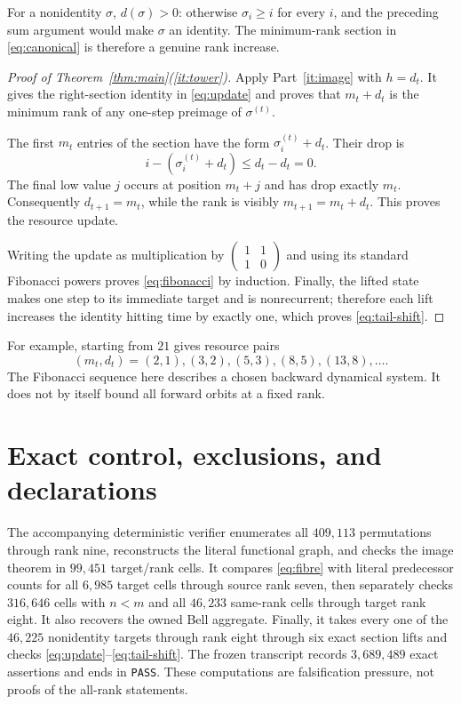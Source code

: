 \documentclass[a4paper,10pt]{amsart}
\theoremstyle{remark}
\begin{document}
For a nonidentity $\sigma$, $d(\sigma)>0$: otherwise
$\sigma_i\ge i$ for every $i$, and the preceding sum argument would make
$\sigma$ an identity.  The minimum-rank section in
\eqref{eq:canonical} is therefore a genuine rank increase.

\begin{proof}[Proof of Theorem~\ref{thm:main}(\ref{it:tower})]
Apply Part~\ref{it:image} with $h=d_t$.  It gives the right-section identity
in \eqref{eq:update} and proves that $m_t+d_t$ is the minimum rank of any
one-step preimage of $\sigma^{(t)}$.

The first $m_t$ entries of the section have the form
$\sigma^{(t)}_i+d_t$.  Their drop is
\[
 i-(\sigma^{(t)}_i+d_t)\le d_t-d_t=0.
\]
The final low value $j$ occurs at position $m_t+j$ and has drop exactly
$m_t$.  Consequently $d_{t+1}=m_t$, while the rank is visibly
$m_{t+1}=m_t+d_t$.  This proves the resource update.

Writing the update as multiplication by
$\left(\begin{smallmatrix}1&1\\1&0\end{smallmatrix}\right)$ and using its
standard Fibonacci powers proves \eqref{eq:fibonacci} by induction.  Finally,
the lifted state makes one step to its immediate target and is nonrecurrent;
therefore each lift increases the identity hitting time by exactly one,
which proves \eqref{eq:tail-shift}.
\end{proof}

For example, starting from $21$ gives resource pairs
\[
 (m_t,d_t)=(2,1),(3,2),(5,3),(8,5),(13,8),\ldots.
\]
The Fibonacci sequence here describes a chosen backward dynamical system.  It
does not by itself bound all forward orbits at a fixed rank.

\section{Exact control, exclusions, and declarations}\label{sec:control}

The accompanying deterministic verifier enumerates all $409{,}113$
permutations through rank nine, reconstructs the literal functional graph,
and checks the image theorem in $99{,}451$ target/rank cells.  It compares
\eqref{eq:fibre} with literal predecessor counts for all $6{,}985$ target
cells through source rank seven, then separately checks $316{,}646$ cells
with \(n<m\) and all $46{,}233$ same-rank cells through target rank eight.
It also recovers the owned Bell aggregate.  Finally, it takes every one of the $46{,}225$
nonidentity targets through rank eight through six exact section lifts and
checks \eqref{eq:update}--\eqref{eq:tail-shift}.  The frozen transcript records
$3{,}689{,}489$ exact assertions and ends in \texttt{PASS}.  These computations
are falsification pressure, not proofs of the all-rank statements.
\end{document}
